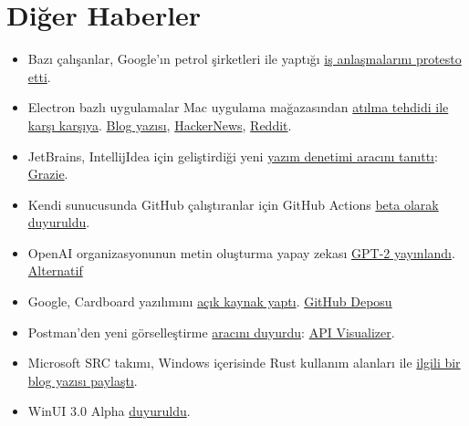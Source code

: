 \documentclass[11pt]{article}
\begin{document}
\section{Diğer Haberler}
\label{sec:org2b9d663}
\begin{itemize}
\item Bazı çalışanlar, Google'ın petrol şirketleri ile yaptığı \href{https://www.bloomberg.com/news/articles/2019-11-04/now-googlers-are-protesting-company-s-cloud-deals-with-big-oil}{iş anlaşmalarını
protesto etti}.
\item Electron bazlı uygulamalar Mac uygulama mağazasından \href{https://www.theregister.co.uk/2019/11/05/apple\_app\_store\_electron}{atılma tehdidi ile
karşı karşıya}. \href{https://onezero.medium.com/apple-is-trying-to-kill-web-technology-a274237c174d}{Blog yazısı}, \href{https://news.ycombinator.com/item?id=21486430}{HackerNews}, \href{https://www.reddit.com/r/programming/comments/dtuv4v/apple\_is\_trying\_to\_kill\_web\_technology}{Reddit}.
\item JetBrains, IntellijIdea için geliştirdiği yeni \href{https://blog.jetbrains.com/idea/2019/11/meet-grazie-the-ultimate-spelling-grammar-and-style-checker-for-intellij-idea/}{yazım denetimi aracını
tanıttı}: \href{https://plugins.jetbrains.com/plugin/12175-grazie/}{Grazie}.
\item Kendi sunucusunda GitHub çalıştıranlar için GitHub Actions \href{https://github.blog/2019-11-05-self-hosted-runners-for-github-actions-is-now-in-beta/}{beta olarak
duyuruldu}.
\item OpenAI organizasyonunun metin oluşturma yapay zekası \href{https://openai.com/blog/gpt-2-1-5b-release/}{GPT-2 yayınlandı}.
\href{https://www.theverge.com/2019/11/7/20953040/openai-text-generation-ai-gpt-2-full-model-release-1-5b-parameters}{Alternatif}
\item Google, Cardboard yazılımını \href{https://www.theverge.com/2019/11/6/20952495/google-cardboard-open-source-phone-based-vr-daydream}{açık kaynak yaptı}. \href{https://github.com/googlevr/cardboard}{GitHub Deposu}
\item Postman'den yeni görselleştirme \href{https://blog.getpostman.com/2019/11/04/visualizing-apis-of-the-world/}{aracını duyurdu}: \href{https://www.getpostman.com/api-visualizer}{API Visualizer}.
\item Microsoft SRC takımı, Windows içerisinde Rust kullanım alanları ile \href{https://msrc-blog.microsoft.com/2019/11/07/using-rust-in-windows/}{ilgili
bir blog yazısı paylaştı}.
\item WinUI 3.0 Alpha \href{https://github.com/microsoft/microsoft-ui-xaml/issues/1531}{duyuruldu}.

\end{itemize}
\end{document}
